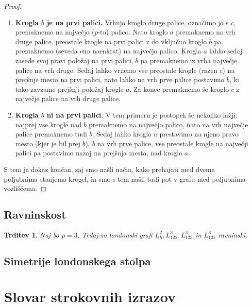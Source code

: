 \documentclass[12pt,a4paper]{amsart}
\theoremstyle{definition} %
\theoremstyle{plain} %
\newtheorem{trditev}[definicija]{Trditev}
\newcommand{\geslo}[2]{\noindent\textbf{#1}\hspace*{3mm}\hangindent=\parindent\hangafter=1 #2}
\begin{document}
\begin{proof}
    \begin{enumerate}
        \item \textbf{Krogla $b$ je na prvi palici.}
        Vrhnjo kroglo druge palice, označimo jo s $c$, premaknemo na največjo ($p$-to) palico. Nato kroglo $a$ premaknemo na vrh druge palice, preostale krogle na prvi palici z do vključno kroglo $b$ pa premaknemo (seveda eno naenkrat) na največjo palico. Krogla $a$ lahko sedaj zasede svoj pravi položaj na prvi palici, $b$ pa premaknemo iz vrha največje palice na vrh druge. Sedaj lahko vrnemo vse preostale krogle (razen $c$) na prejšnje mesto na prvi palici, nato lahko na vrh prve palice postavimo $b$, ki tako zavzame prejšnji položaj krogle $a$. Za konec premaknemo še kroglo $c$ z največje palice na vrh druge palice.
        \item \textbf{Krogla $b$ ni na prvi palici.}
        V tem primeru je postopek še nekoliko lažji: najprej vse krogle nad $b$ premaknemo na največjo palico, nato na vrh največje palice premaknemo tudi $b$. Sedaj lahko kroglo $a$ prestavimo na njeno pravo mesto (kjer je bil prej $b$), $b$ na vrh prve palice, vse preostale krogle na največji palici pa postavimo nazaj na prejšnja mesta, nad kroglo $a$.
    \end{enumerate}
    S tem je dokaz končan, saj smo našli način, kako prehajati med dvema poljubnima stanjema krogel, in smo s tem našli tudi pot v grafu med poljubnima vozliščema.
\end{proof}

\subsection{Ravninskost}

\begin{trditev}
    Naj bo $p=3$. Tedaj so londonski grafi $L_h^2, L_{122}^3,L_{123}^3$ in $ L_{133}^3$ ravninski.
\end{trditev}

\subsection{Simetrije londonskega stolpa}

\section*{Slovar strokovnih izrazov}

%
%
\end{document}
